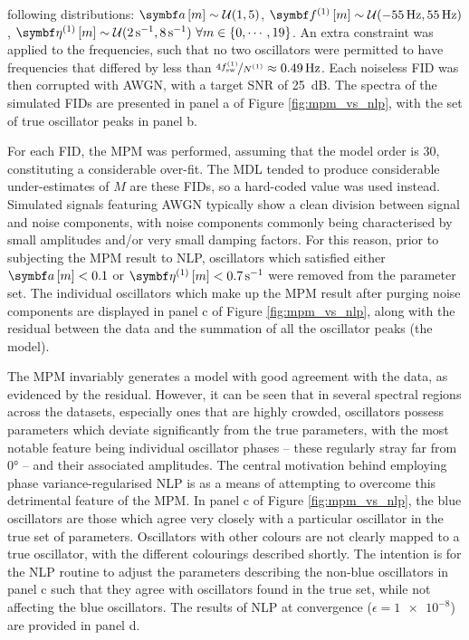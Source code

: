 following distributions:
$\bdam \sim \mathcal{U}(1, 5)$, $\bdfonem \sim \mathcal{U}(\qty{-55}{\hertz},
\qty{55}{\hertz})$, $\bdetaonem \sim \mathcal{U}(\qty{2}{\per\second},
\qty{8}{\per\second})\ \forall m \in \lbrace 0, \cdots, 19\rbrace$. An extra
constraint was applied to the frequencies,
such that no two oscillators were permitted to have frequencies that differed
by less than $\nicefrac{4 f_{\mathrm{sw}}^{(1)}}{N^{(1)}} \approx \qty{0.49}{\hertz}$. Each
noiseless \ac{FID} was then corrupted with \ac{AWGN}, with a target \ac{SNR} of
\qty{25}{\deci\bel}. The spectra of the simulated
\acp{FID} are presented in panel a of Figure \ref{fig:mpm_vs_nlp}, with the set
of true oscillator peaks in panel b.

For each \ac{FID}, the \ac{MPM} was performed, assuming that the model order is
30, constituting a considerable over-fit. The \ac{MDL} tended to produce
considerable under-estimates of $M$ are these \acp{FID}, so a hard-coded value
was used instead. Simulated signals featuring \ac{AWGN} typically show a
clean division between signal and noise components, with noise components
commonly being characterised by small amplitudes and/or very small damping
factors. For this reason, prior to subjecting the \ac{MPM} result to \ac{NLP},
oscillators which satisfied either $\bdam < 0.1$ or  $\bdetaonem <
\qty{0.7}{\per\second}$ were removed from the parameter set. The individual
oscillators which make up the \ac{MPM} result after purging noise components
are displayed in panel c of Figure \ref{fig:mpm_vs_nlp}, along with the
residual between the data and the summation of all the oscillator peaks (the
model).


The \ac{MPM} invariably generates a model with good agreement with the data, as
evidenced by the residual.
However, it can be seen that in several spectral regions across the datasets,
especially ones that are highly crowded, oscillators possess parameters which
deviate significantly from the true parameters, with the most notable feature
being individual oscillator phases -- these regularly stray far from \ang{0} --
and their associated amplitudes. The central motivation behind employing phase
variance-regularised \ac{NLP} is as a means of attempting to overcome this
detrimental feature of the \ac{MPM}.
In panel c of Figure \ref{fig:mpm_vs_nlp}, the blue oscillators are those which
agree very closely with a particular oscillator in the true set of parameters.
Oscillators with other colours are not clearly mapped to a true oscillator,
with the different colourings described shortly.
The intention is for the \ac{NLP} routine to adjust the parameters describing
the non-blue oscillators in panel c such that they agree with oscillators found
in the true set, while not affecting the blue oscillators.
The results of \ac{NLP} at convergence ($\epsilon = \num{1e-8}$) are provided
in panel d.

